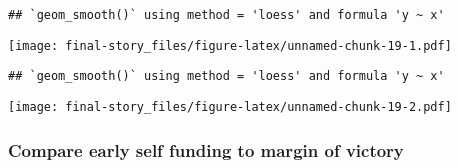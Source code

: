 \documentclass[
]{article}
\newenvironment{Shaded}{\begin{snugshade}}{\end{snugshade}}
\newcommand{\DataTypeTok}[1]{\textcolor[rgb]{0.13,0.29,0.53}{#1}}
\newcommand{\DecValTok}[1]{\textcolor[rgb]{0.00,0.00,0.81}{#1}}
\newcommand{\KeywordTok}[1]{\textcolor[rgb]{0.13,0.29,0.53}{\textbf{#1}}}
\newcommand{\NormalTok}[1]{#1}
\newcommand{\OperatorTok}[1]{\textcolor[rgb]{0.81,0.36,0.00}{\textbf{#1}}}
\newcommand{\StringTok}[1]{\textcolor[rgb]{0.31,0.60,0.02}{#1}}
\begin{document}
\begin{verbatim}
## `geom_smooth()` using method = 'loess' and formula 'y ~ x'
\end{verbatim}

\texttt{[image: final-story\_files/figure-latex/unnamed-chunk-19-1.pdf]}

\begin{Shaded}
\end{Shaded}

\begin{verbatim}
## `geom_smooth()` using method = 'loess' and formula 'y ~ x'
\end{verbatim}

\texttt{[image: final-story\_files/figure-latex/unnamed-chunk-19-2.pdf]}

\hypertarget{compare-early-self-funding-to-margin-of-victory-1}{%
\subsubsection{Compare early self funding to margin of
victory}\label{compare-early-self-funding-to-margin-of-victory-1}}
\end{document}
